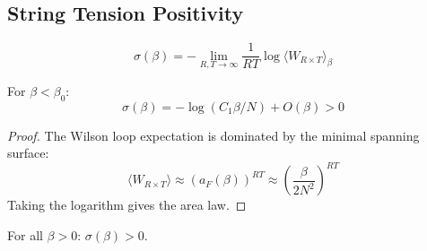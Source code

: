 \subsection{String Tension Positivity}

\begin{definition}
\begin{equation}
\sigma(\beta) = -\lim_{R,T \to \infty} \frac{1}{RT} \log\langle W_{R \times T} \rangle_\beta
\end{equation}
\end{definition}

\begin{theorem}
\label{thm:strong_sigma}
For $\beta < \beta_0$:
\begin{equation}
\sigma(\beta) = -\log(C_1\beta/N) + O(\beta) > 0
\end{equation}
\end{theorem}

\begin{proof}
The Wilson loop expectation is dominated by the minimal spanning surface:
\begin{equation}
\langle W_{R \times T} \rangle \approx (a_F(\beta))^{RT} \approx \left(\frac{\beta}{2N^2}\right)^{RT}
\end{equation}
Taking the logarithm gives the area law.
\end{proof}

\begin{theorem}
\label{thm:global_sigma}
For all $\beta > 0$: $\sigma(\beta) > 0$.
\end{theorem}


